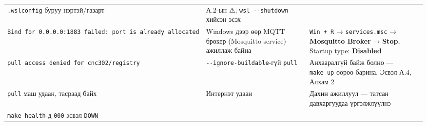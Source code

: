 \begin{longtable}[]{@{}lll@{}}
\begin{minipage}[t]{0.30\columnwidth}
\texttt{.wslconfig} буруу нэртэй/газарт\strut
\end{minipage} & \begin{minipage}[t]{0.30\columnwidth}\raggedright
А.2-ын ⚠; \texttt{wsl\ -\/\allowbreak{}-shutdown} хийсэн эсэх\strut
\end{minipage}\tabularnewline
\begin{minipage}[t]{0.30\columnwidth}\raggedright
\texttt{Bind\ for\ 0.\allowbreak{}0.\allowbreak{}0.\allowbreak{}0:\allowbreak{}1883\ failed:\allowbreak{}\ port\ is\ already\ allocated}\strut
\end{minipage} & \begin{minipage}[t]{0.30\columnwidth}\raggedright
Windows дээр өөр MQTT брокер (Mosquitto service) ажиллаж байна\strut
\end{minipage} & \begin{minipage}[t]{0.30\columnwidth}\raggedright
\texttt{Win\ +\ R} → \texttt{services.msc} → \textbf{Mosquitto Broker} → \textbf{Stop}, Startup type: \textbf{Disabled}\strut
\end{minipage}\tabularnewline
\begin{minipage}[t]{0.30\columnwidth}\raggedright
\texttt{pull\ access\ denied\ for\ cnc302/\allowbreak{}registry}\strut
\end{minipage} & \begin{minipage}[t]{0.30\columnwidth}\raggedright
\texttt{-\/\allowbreak{}-ignore-buildable}-гүй \texttt{pull}\strut
\end{minipage} & \begin{minipage}[t]{0.30\columnwidth}\raggedright
Анхааралгүй байж болно --- \texttt{make\ up} өөрөө барина. Эсвэл А.4, Алхам 2\strut
\end{minipage}\tabularnewline
\begin{minipage}[t]{0.30\columnwidth}\raggedright
\texttt{pull} маш удаан, тасраад байх\strut
\end{minipage} & \begin{minipage}[t]{0.30\columnwidth}\raggedright
Интернэт удаан\strut
\end{minipage} & \begin{minipage}[t]{0.30\columnwidth}\raggedright
Дахин ажиллуул --- татсан давхаргуудаа үргэлжлүүлнэ\strut
\end{minipage}\tabularnewline
\begin{minipage}[t]{0.30\columnwidth}\raggedright
\texttt{make\ health}-д \texttt{000} эсвэл \texttt{DOWN}\strut
\end{minipage} & \begin{minipage}[t]{0.30\columnwidth}\raggedright

\end{minipage}
\end{longtable}
